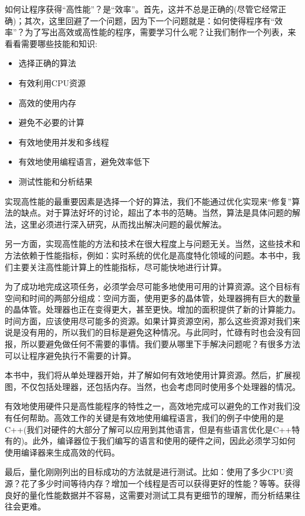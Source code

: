 如何让程序获得“高性能”？是“效率”。首先，这并不总是正确的(尽管它经常正确)；其次，这里回避了一个问题，因为下一个问题就是：如何使得程序有“效率”？为了写出高效或高性能的程序，需要学习什么呢？让我们制作一个列表，来看看需要哪些技能和知识:

\begin{itemize}
\item 选择正确的算法
\item 有效利用CPU资源
\item 高效的使用内存
\item 避免不必要的计算
\item 有效地使用并发和多线程
\item 有效地使用编程语言，避免效率低下
\item 测试性能和分析结果
\end{itemize}

实现高性能的最重要因素是选择一个好的算法，我们不能通过优化实现来“修复”算法的缺点。对于算法好坏的讨论，超出了本书的范畴。当然，算法是具体问题的解法，这里必须进行深入研究，从而找出解决问题的最优解法。

另一方面，实现高性能的方法和技术在很大程度上与问题无关。当然，这些技术和方法依赖于性能指标，例如：实时系统的优化是高度特化领域的问题。本书中，我们主要关注高性能计算上的性能指标，尽可能快地进行计算。

为了成功地完成这项任务，必须学会尽可能多地使用可用的计算资源。这个目标有空间和时间的两部分组成：空间方面，使用更多的晶体管，处理器拥有巨大的数量的晶体管。处理器也正在变得更大，甚至更快。增加的面积提供了新的计算能力。时间方面，应该使用尽可能多的资源。如果计算资源空闲，那么这些资源对我们来说是没有用的，所以我们的目标是避免这种情况。与此同时，忙碌有时也会没有回报，所以要避免做任何不需要的事情。我们要从哪里下手解决问题呢？有很多方法可以让程序避免执行不需要的计算。

本书中，我们将从单处理器开始，并了解如何有效地使用计算资源。然后，扩展视图，不仅包括处理器，还包括内存。当然，也会考虑同时使用多个处理器的情况。

有效地使用硬件只是高性能程序的特性之一，高效地完成可以避免的工作对我们没有任何帮助。高效工作的关键是有效地使用编程语言，我们的例子中使用的是C++(我们对硬件的大部分了解可以应用到其他语言，但是有些语言优化是C++特有的)。此外，编译器位于我们编写的语言和使用的硬件之间，因此必须学习如何使用编译器来生成高效的代码。

最后，量化刚刚列出的目标成功的方法就是进行测试。比如：使用了多少CPU资源？花了多少时间等待内存？增加一个线程是否可以获得更好的性能？等等。获得良好的量化性能数据并不容易，这需要对测试工具有更细节的理解，而分析结果往往会更难。


